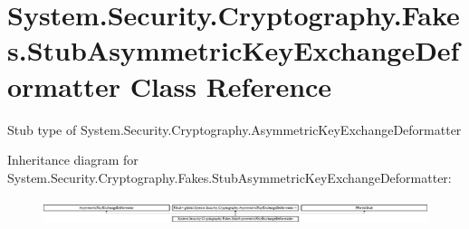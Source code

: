 \hypertarget{class_system_1_1_security_1_1_cryptography_1_1_fakes_1_1_stub_asymmetric_key_exchange_deformatter}{\section{System.\-Security.\-Cryptography.\-Fakes.\-Stub\-Asymmetric\-Key\-Exchange\-Deformatter Class Reference}
\label{class_system_1_1_security_1_1_cryptography_1_1_fakes_1_1_stub_asymmetric_key_exchange_deformatter}
}


Stub type of System.\-Security.\-Cryptography.\-Asymmetric\-Key\-Exchange\-Deformatter 


Inheritance diagram for System.\-Security.\-Cryptography.\-Fakes.\-Stub\-Asymmetric\-Key\-Exchange\-Deformatter\-:\begin{figure}[H]
\begin{center}
\leavevmode
\includegraphics[height=0.752688cm]{class_system_1_1_security_1_1_cryptography_1_1_fakes_1_1_stub_asymmetric_key_exchange_deformatter}
\end{center}
\end{figure}
